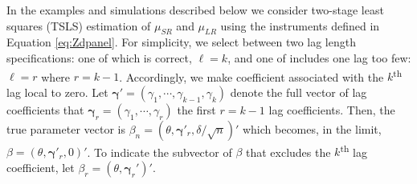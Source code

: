 In the examples and simulations described below we consider two-stage least squares (TSLS) estimation of $\mu_{SR}$ and $\mu_{LR}$ using the instruments defined in Equation \ref{eq:Zdpanel}. 
For simplicity, we select between two lag length specifications: one of which is correct, $\ell = k$, and one of includes one lag too few: $\ell = r$ where $r = k-1$.
Accordingly, we make coefficient associated with the $k$\textsuperscript{th} lag local to zero.
Let $\boldsymbol{\gamma}' = (\gamma_1, \cdots, \gamma_{k-1}, \gamma_{k})$ denote the full vector of lag coefficients that $\boldsymbol{\gamma}_{r} = (\gamma_1, \cdots, \gamma_{r})$ the first $r = k-1$ lag coefficients.
Then, the true parameter vector is $\beta_n = (\theta, \boldsymbol{\gamma}'_{r}, \delta/\sqrt{n})'$ which becomes, in the limit, $\beta = (\theta, \boldsymbol{\gamma}'_r, 0)'$.
To indicate the subvector of $\beta$ that excludes the $k$\textsuperscript{th} lag coefficient, let $\beta_{r} = (\theta, \boldsymbol{\gamma}_r')'$.

